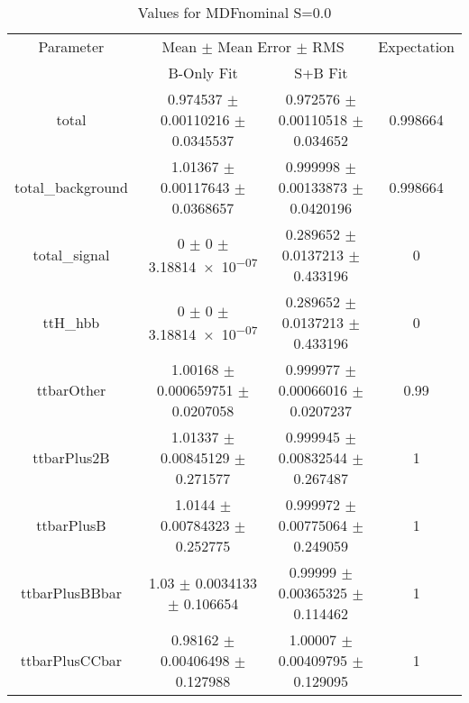 \begin{table}
\centering
\caption{Values for MDFnominal S=0.0}
\begin{tabular}{cccc}
\toprule
Parameter & \multicolumn{2}{c}{Mean $\pm$ Mean Error $\pm$ RMS} & Expectation\\
 & B-Only Fit & S+B Fit & \\
\midrule
total & \num{0.974537} $\pm$ \num{0.00110216} $\pm$ \num{0.0345537} & \num{0.972576} $\pm$ \num{0.00110518} $\pm$ \num{0.034652} & \num{0.998664}\\
total\_background & \num{1.01367} $\pm$ \num{0.00117643} $\pm$ \num{0.0368657} & \num{0.999998} $\pm$ \num{0.00133873} $\pm$ \num{0.0420196} & \num{0.998664}\\
total\_signal & \num{0} $\pm$ \num{0} $\pm$ \num{3.18814e-07} & \num{0.289652} $\pm$ \num{0.0137213} $\pm$ \num{0.433196} & \num{0}\\
ttH\_hbb & \num{0} $\pm$ \num{0} $\pm$ \num{3.18814e-07} & \num{0.289652} $\pm$ \num{0.0137213} $\pm$ \num{0.433196} & \num{0}\\
ttbarOther & \num{1.00168} $\pm$ \num{0.000659751} $\pm$ \num{0.0207058} & \num{0.999977} $\pm$ \num{0.00066016} $\pm$ \num{0.0207237} & \num{0.99}\\
ttbarPlus2B & \num{1.01337} $\pm$ \num{0.00845129} $\pm$ \num{0.271577} & \num{0.999945} $\pm$ \num{0.00832544} $\pm$ \num{0.267487} & \num{1}\\
ttbarPlusB & \num{1.0144} $\pm$ \num{0.00784323} $\pm$ \num{0.252775} & \num{0.999972} $\pm$ \num{0.00775064} $\pm$ \num{0.249059} & \num{1}\\
ttbarPlusBBbar & \num{1.03} $\pm$ \num{0.0034133} $\pm$ \num{0.106654} & \num{0.99999} $\pm$ \num{0.00365325} $\pm$ \num{0.114462} & \num{1}\\
ttbarPlusCCbar & \num{0.98162} $\pm$ \num{0.00406498} $\pm$ \num{0.127988} & \num{1.00007} $\pm$ \num{0.00409795} $\pm$ \num{0.129095} & \num{1}\\
\bottomrule
\end{tabular}
\end{table}
